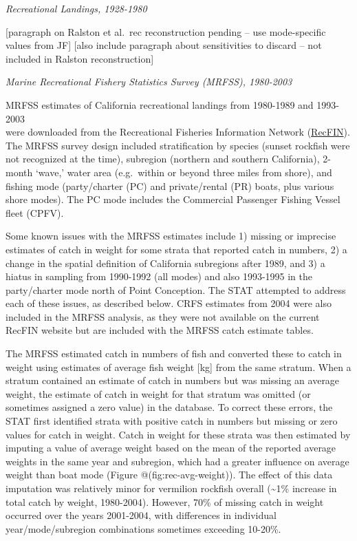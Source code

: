 \documentclass[
  english,
  a4paper,
]{article}
\begin{document}
\emph{Recreational Landings, 1928-1980}

{[}paragraph on Ralston et al.~rec reconstruction pending -- use mode-specific values from JF{]}
{[}also include paragraph about sensitivities to discard -- not included in Ralston reconstruction{]}

\emph{Marine Recreational Fishery Statistics Survey (MRFSS), 1980-2003}

MRFSS estimates of California recreational landings from 1980-1989 and 1993-2003\\
were downloaded from the Recreational Fisheries Information Network
(\href{https://www.recfin.org/}{RecFIN}). The MRFSS survey design included stratification by
species (sunset rockfish were not recognized at the time), subregion (northern
and southern California), 2-month `wave,' water area (e.g.~within or beyond
three miles from shore), and fishing mode (party/charter (PC) and private/rental (PR) boats,
plus various shore modes). The PC mode includes the Commercial Passenger Fishing Vessel
fleet (CPFV).

Some known issues with the MRFSS estimates include 1) missing or imprecise estimates of catch
in weight for some strata that reported catch in numbers, 2) a change in the
spatial definition of California subregions after 1989, and 3) a hiatus in
sampling from 1990-1992 (all modes) and also 1993-1995 in the party/charter mode
north of Point Conception. The STAT attempted to address each of these issues,
as described below. CRFS estimates from 2004 were also included in the MRFSS
analysis, as they were not available on the current RecFIN website but are
included with the MRFSS catch estimate tables.

The MRFSS estimated catch in numbers of fish and converted these to catch in
weight using estimates of average fish weight {[}kg{]} from the same stratum. When
a stratum contained an estimate of catch in numbers but was missing an average
weight, the estimate of catch in weight for that stratum was omitted (or sometimes
assigned a zero value) in the database. To correct these errors, the STAT first
identified strata with positive catch in numbers but missing or zero values for
catch in weight. Catch in weight for these strata was then estimated by imputing
a value of average weight based on the mean of the reported average weights in
the same year and subregion, which had a greater influence on average
weight than boat mode (Figure @(fig:rec-avg-weight)). The effect of this data imputation was relatively
minor for vermilion rockfish overall (\textasciitilde1\% increase in total catch by weight,
1980-2004). However, 70\% of missing catch in weight occurred over the years
2001-2004, with differences in individual year/mode/subregion combinations sometimes exceeding 10-20\%.
\end{document}

